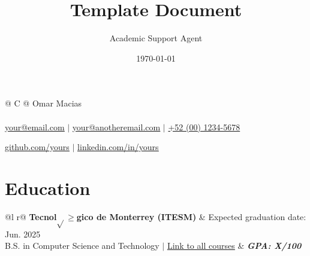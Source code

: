 \documentclass{article}
\title{Template Document}
\author{Academic Support Agent}
\date{\today}
\begin{document}
\maketitle

\pagestyle{empty} 


\begin{tabularx}{\linewidth}{@{} C @{}}
\color[HTML]{1C033C} \Huge{Omar Macias} \\[6pt]
\\
\textcolor[HTML]{371e77}{\underline{\href{mailto:your@email.com}{\raisebox{-0.05\height}{\faEnvelope} your@email.com}} $|$}
\textcolor[HTML]{371e77}{\underline{\href{mailto:your@anotheremail.com}{\raisebox{-0.05\height}{\faEnvelope} your@anotheremail.com}} $|$}
\textcolor[HTML]{371e77}{\href{tel:+525513219900}{\raisebox{-0.05\height}{\faMobile} +52 (00) 1234-5678}}

\textcolor[HTML]{371e77}{\underline{\href{https://github.com/yours}{\raisebox{-0.05\height}{\faGithub} github.com/yours}} $|$}
\textcolor[HTML]{371e77}{\underline{\href{https://linkedin.com/in/yours}{\raisebox{-0.05\height}{\faLinkedin} linkedin.com/in/yours}}}
\end{tabularx}

\section{Education}
\begin{tabularx}{\linewidth}{ @{}l r@{} }
\color[HTML]{1C033C} \textbf{Tecnol$\sqrt{}$$\geq$gico de Monterrey (ITESM)} & \hfill \color[HTML]{371e77} Expected graduation date: Jun. 2025 \\
\color[HTML]{371e77} B.S. in Computer Science and Technology $|$ {\uline{\href{https://linktoyourcarrer.site}{Link to all courses}}} & \hfill \color[HTML]{4B28A4} \textit{\textbf{GPA: X/100}} \\
\end{tabularx}


\end{document}
